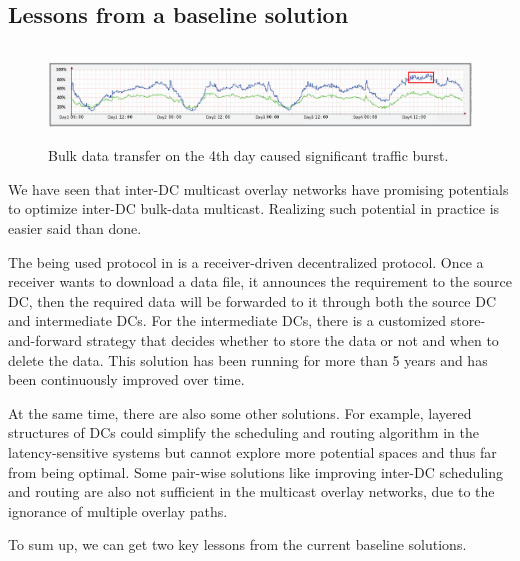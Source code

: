 \subsection{Lessons from a baseline solution}
\label{subsec:motivation:baseline}

\begin{figure}[t]
        \center
        \includegraphics[height=25mm,width=150mm]{images/nj02-M2A_0212-0216.eps}
        \caption{Bulk data transfer on the 4th day caused significant traffic burst.}
        \label{fig:lesson2}
\end{figure}

We have seen that inter-DC multicast overlay networks have promising
potentials to optimize inter-DC bulk-data multicast.
Realizing such potential in practice is easier said than done.


The being used protocol in \company is a receiver-driven decentralized protocol. Once a receiver wants to download a data file, it announces the requirement to the source DC, then the required data will be forwarded to it through both the source DC and intermediate DCs. For the intermediate DCs, there is a customized store-and-forward strategy that decides whether to store the data or not and when to delete the data. This solution has been running for more than 5 years and has been continuously improved over time.

At the same time, there are also some other solutions. For example, layered structures of DCs \cite{??} could simplify the scheduling and routing algorithm in the latency-sensitive systems but cannot explore more potential spaces and thus far from being optimal. Some pair-wise solutions like \cite{b4,bwe} improving inter-DC scheduling and routing are also not sufficient in the multicast overlay networks, due to the ignorance of multiple overlay paths.

To sum up, we can get two key lessons from the current baseline solutions.


